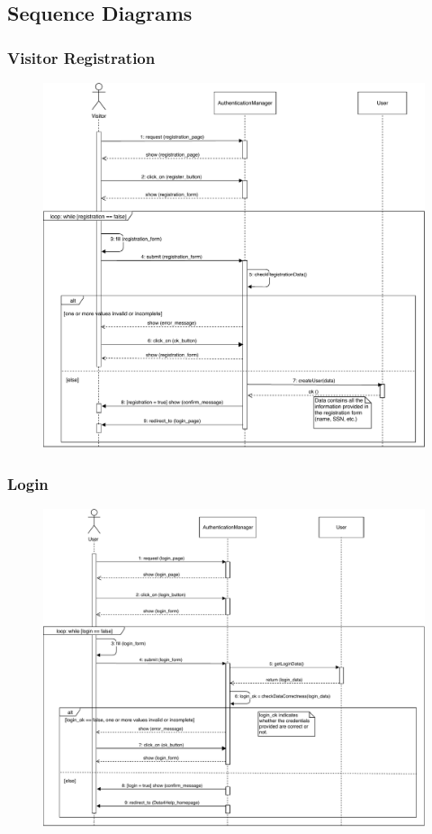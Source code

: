\documentclass[12pt,a4paper]{article}
\begin{document}
	\subsection{Sequence Diagrams}
		\subsubsection{Visitor Registration}
			\begin{figure}[H]
				\centering
				\includegraphics[width=1.25\linewidth]{Images/registration_sequence}
				\label{fig:registration_sequence}
			\end{figure}
		\subsubsection{Login}
		\begin{figure}[H]
			\centering
			\includegraphics[width=1.2\linewidth]{Images/login_sequence}
			\label{fig:login_sequence}
		\end{figure}
\end{document}
